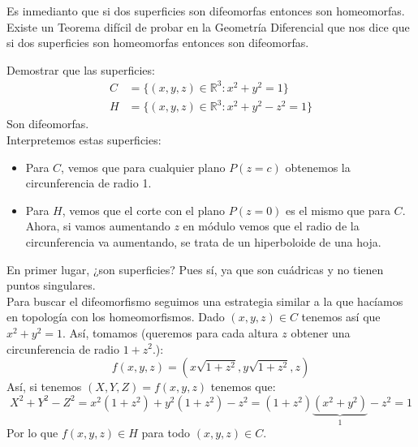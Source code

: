 \begin{observacion}
    Es inmedianto que si dos superficies son difeomorfas entonces son homeomorfas. Existe un Teorema difícil de probar en la Geometría Diferencial que nos dice que si dos superficies son homeomorfas entonces son difeomorfas.
\end{observacion}

\begin{ejercicio}
    Demostrar que las superficies:
    \begin{align*}
        C &= \{(x,y,z)\in \mathbb{R}^3 : x^2+y^2 = 1\} \\
        H &= \{(x,y,z)\in \mathbb{R}^3 : x^2+y^2-z^2 = 1\}
    \end{align*}
    Son difeomorfas.\\

    \noindent
    Interpretemos estas superficies:
    \begin{itemize}
        \item Para $C$, vemos que para cualquier plano $P(z=c)$ obtenemos la circunferencia de radio 1.
        \item Para $H$, vemos que el corte con el plano $P(z=0)$ es el mismo que para $C$. Ahora, si vamos aumentando $z$ en módulo vemos que el radio de la circunferencia va aumentando, se trata de un hiperboloide de una hoja.
    \end{itemize}

    \noindent
    En primer lugar, ¿son superficies? Pues sí, ya que son cuádricas y no tienen puntos singulares.\\

    \noindent
    Para buscar el difeomorfismo seguimos una estrategia similar a la que hacíamos en topología con los homeomorfismos. Dado $(x,y,z)\in C$ tenemos así que $x^2+y^2 = 1$. Así, tomamos (queremos para cada altura $z$ obtener una circunferencia de radio $1+z^2$.):
    \begin{equation*}
        f(x,y,z) = \left(x\sqrt{1+z^2}, y\sqrt{1+z^2}, z\right)
    \end{equation*}
    Así, si tenemos $(X,Y,Z)=f(x,y,z)$ tenemos que:
    \begin{equation*}
        X^2 + Y^2 - Z^2 = x^2(1+z^2) + y^2(1+z^2) - z^2 = (1+z^2)\underbrace{(x^2 + y^2)}_1 - z^2 = 1
    \end{equation*}
    Por lo que $f(x,y,z)\in H$ para todo $(x,y,z)\in C$.\\


\end{ejercicio}
